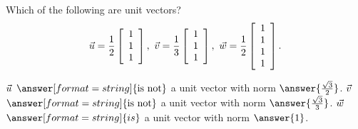 \documentclass{ximera}
\author{Zack Reed}
\begin{document}
\begin{problem}

Which of the following are unit vectors?
\begin{equation*}
  \vect{u}=\frac{1}{2}\startmat{c}1\\1\\1\stopmat, \quad
  \vect{v}=\frac{1}{3}\startmat{c}1\\1\\1\stopmat, \quad
  \vect{w}=\frac{1}{2}\startmat{c}1\\1\\1\\1\stopmat.
\end{equation*}

$\vect{u}$ $\answer[format=string]{\text{is not}}$ a unit vector with norm $\answer{\frac{\sqrt{3}}{2}}$. $\vect{v}$ $\answer[format=string]{\text{is not}}$ a unit vector with norm $\answer{\frac{\sqrt{3}}{3}}$. $\vect{w}$ $\answer[format=string]{is}$ a unit vector with norm $\answer{1}$.

\end{problem}
\end{document}
